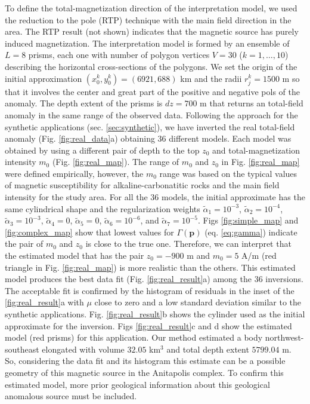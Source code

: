 To define the total-magnetization direction of the interpretation model, we used the reduction to the pole (RTP) technique with the main field direction in the area. The RTP result (not shown) indicates that the magnetic source has purely induced magnetization. The interpretation model is formed by an ensemble of $L = 8$ prisms, each one with number of polygon vertices $V = 30$ ($k = 1, \dots , 10$) describing the horizontal cross-sections of the polygons. We set the origin of the initial approximation $(x_0^k, y_0^k) = (6921, 688)$ km and the radii $r_j^k = 1500$ m so that it involves the center and great part of the positive and negative pols of the anomaly. The depth extent of the prisms is $dz = 700$ m that returns an total-field anomaly in the same range of the observed data. Following the approach for the synthetic applications (sec. \ref{sec:synthetic}), we have inverted the real total-field anomaly (Fig. \ref{fig:real_data}a) obtaining 36 different models. Each model was obtained by using a different pair of depth to the top $z_0$ and total-magnetization intensity $m_0$ (Fig. \ref{fig:real_map}). The range of $m_0$ and $z_0$ in Fig. \ref{fig:real_map} were defined empirically, however, the $m_0$ range was based on the typical values of magnetic susceptibility for alkaline-carbonatitic rocks and the main field intensity for the study area. For all the 36 models, the initial approximate has the same cylindrical shape and the regularization weights $\tilde{\alpha}_1 = 10^{-3}$, $\tilde{\alpha}_2 = 10^{-4}$, $\tilde{\alpha}_3 = 10^{-3}$, $\tilde{\alpha}_4 = 0$, $\tilde{\alpha}_5 = 0$, $\tilde{\alpha}_6 = 10^{-6}$, and $\tilde{\alpha}_7 = 10^{-5}$. Figs \ref{fig:simple_map} and \ref{fig:complex_map} show that lowest values for $\Gamma(\mathbf{p})$ (eq. \ref{eq:gamma}) indicate the pair of $m_0$ and $z_0$ is close to the true one. Therefore, we can interpret that the estimated model that has the pair $z_0 = -900$ m and $m_0 = 5$ A/m (red triangle in Fig. \ref{fig:real_map}) is more realistic than the others. This estimated model produces the best data fit (Fig. \ref{fig:real_result}a) among the 36 inversions. The acceptable fit is confirmed by the histogram of residuals in the inset of the \ref{fig:real_result}a with $ \mu $ close to zero and a low standard deviation similar to the synthetic applications. Fig. \ref{fig:real_result}b shows the cylinder used as the initial approximate for the inversion. Figs \ref{fig:real_result}c and d show the estimated model (red prisms) for this application. Our method estimated a body northwest-southeast elongated with volume $ 32.05 $ km$ ^3 $ and total depth extent $ 5799.04 $ m. So, considering the data fit and its histogram this estimate can be a possible geometry of this magnetic source in the Anitapolis complex. To confirm this estimated model, more prior geological information about this geological anomalous source must be included.